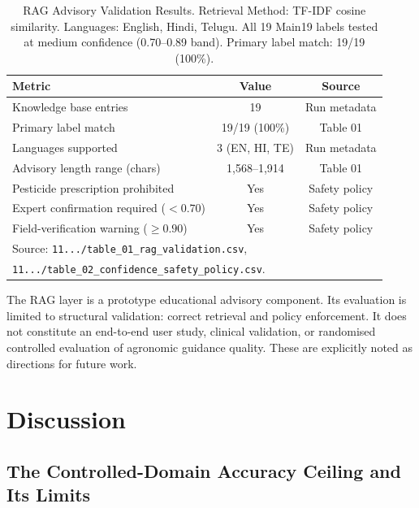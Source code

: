 \documentclass[conference]{IEEEtran}
\begin{document}
\begin{table}[t]
\caption{RAG Advisory Validation Results.
Retrieval Method: TF-IDF cosine similarity. Languages: English, Hindi,
Telugu. All 19 Main19 labels tested at medium confidence (0.70--0.89 band).
Primary label match: 19/19 (100\%).}
\label{tab:rag_validation}
\centering
\begin{tabular}{lcc}
\toprule
\textbf{Metric} & \textbf{Value} & \textbf{Source} \\
\midrule
Knowledge base entries & 19 & Run metadata \\
Primary label match & 19/19 (100\%) & Table 01 \\
Languages supported & 3 (EN, HI, TE) & Run metadata \\
Advisory length range (chars) & 1,568--1,914 & Table 01 \\
Pesticide prescription prohibited & Yes & Safety policy \\
Expert confirmation required ($<0.70$) & Yes & Safety policy \\
Field-verification warning ($\geq 0.90$) & Yes & Safety policy \\
\bottomrule
\multicolumn{3}{l}{\small Source: \texttt{11.../table\_01\_rag\_validation.csv},} \\
\multicolumn{3}{l}{\small \texttt{11.../table\_02\_confidence\_safety\_policy.csv}.} \\
\end{tabular}
\end{table}

The RAG layer is a prototype educational advisory component. Its evaluation
is limited to structural validation: correct retrieval and policy enforcement.
It does not constitute an end-to-end user study, clinical validation, or
randomised controlled evaluation of agronomic guidance quality. These are
explicitly noted as directions for future work.

\section{Discussion}

\subsection{The Controlled-Domain Accuracy Ceiling and Its Limits}
\end{document}
